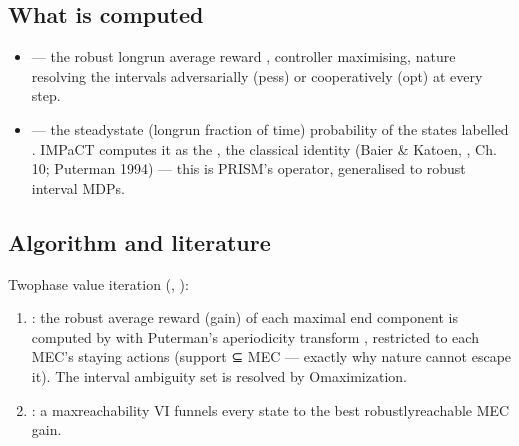 \documentclass[a4paper,10pt,english]{sphinxmanual}
\begin{document}
\subsection{What is computed}
\label{\detokenize{manual/lra-steadystate:what-is-computed}}\begin{itemize}
\item {} 
\sphinxAtStartPar
{} — the robust long\sphinxhyphen{}run average reward
, controller maximising, nature resolving the
intervals adversarially (pess) or cooperatively (opt) at every step.

\item {} 
\sphinxAtStartPar
{} — the steady\sphinxhyphen{}state (long\sphinxhyphen{}run fraction of time) probability of the
states labelled . IMPaCT computes it as the  , the classical identity (Baier \& Katoen, , Ch. 10; Puterman 1994) — this is PRISM’s  operator, generalised
to robust interval MDPs.

\end{itemize}


\subsection{Algorithm and literature}
\label{\detokenize{manual/lra-steadystate:algorithm-and-literature}}
\sphinxAtStartPar
Two\sphinxhyphen{}phase value iteration (, ):
\begin{enumerate}
%
\item {} 
\sphinxAtStartPar
{}: the robust average reward (gain) of each maximal end component is
computed by  with Puterman’s aperiodicity transform
, restricted to each MEC’s staying
actions (support ⊆ MEC — exactly why nature cannot escape it). The interval
ambiguity set is resolved by O\sphinxhyphen{}maximization.

\item {} 
\sphinxAtStartPar
{}: a max\sphinxhyphen{}reachability VI funnels every state to the best
robustly\sphinxhyphen{}reachable MEC gain.

\end{enumerate}
\end{document}
